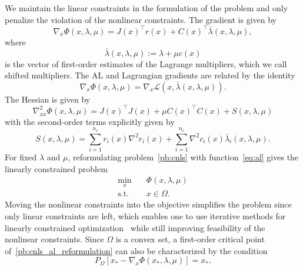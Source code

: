 \documentclass{article}
\numberwithin{equation}{section}
\newcommand{\calL}{{\mathcal{L}}}
\newcommand{\proj}[2]{P_{#1} \left[ {#2} \right]} %
\theoremstyle{plain}
\begin{document}
We maintain the linear constraints in the formulation of the problem and only penalize the violation of the nonlinear constraints.
The gradient is given by 
\begin{equation*}
	\nabla_x \Phi(x,\lambda,\mu) = J(x)^\top r(x) + C(x)^\top\bar{\lambda}(x,\lambda,\mu),
\end{equation*}
where
\begin{equation}\label{eq:1st_order_mult}
	\bar{\lambda}(x,\lambda,\mu):=\lambda + \mu c(x)
\end{equation} 
is the vector of first-order estimates of the Lagrange multipliers, which we call shifted multipliers. The AL and Lagrangian gradients are related by the identity
\begin{equation}\label{eq:identity_al_lag_grad}
	\nabla_x \Phi(x,\lambda,\mu) = \nabla_x \calL(x,\bar{\lambda}(x,\lambda,\mu)).
\end{equation}
The Hessian is given by
\begin{equation*}
	\nabla^2_{xx} \Phi(x,\lambda,\mu) = J(x)^\top J(x) + \mu C(x)^\top C(x) +  S(x,\lambda,\mu) 
\end{equation*}
with the second-order terms explicitly given by
\begin{equation}\label{eq:al_hessian_2nd_terms}
	S(x,\lambda,\mu) =\sum_{i=1}^{n_r} r_i(x) \nabla^2r_i(x) + \sum_{i=1}^{n_c} \nabla^2 c_i(x) \bar{\lambda}_i(x,\lambda,\mu).
\end{equation}
For fixed $\lambda$ and $\mu$, reformulating problem~\eqref{pb:cnls} with function~\eqref{eq:al} gives the linearly constrained problem
\begin{equation}\label{pb:cnls_al_reformulation} 
	\begin{aligned}
		\min_{x} \quad& \Phi(x,\lambda,\mu)  \\
		\text{s.t.}  \quad & x \in \Omega.
	\end{aligned}	
\end{equation}
Moving the nonlinear constraints into the objective simplifies the problem since only linear constraints are left, which enables one to use iterative methods for linearly constrained optimization~\cite{gould-etal:2001,conn-etal:1988b} while still improving feasibility of the nonlinear constraints. Since $\Omega$ is a convex set, a first-order critical point of~\eqref{pb:cnls_al_reformulation} can also be characterized by the condition
\begin{equation*}
	\proj{\Omega}{x_*-\nabla_x \Phi(x_*,\lambda,\mu)} = x_*.
\end{equation*}
\end{document}
